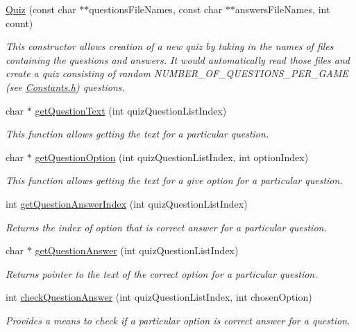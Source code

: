 \begin{DoxyCompactItemize}
\item 
\mbox{\hyperlink{class_quiz_a406e76ea2588e0dd0199ef92435241c2}{Quiz}} (const char $\ast$$\ast$questions\+File\+Names, const char $\ast$$\ast$answers\+File\+Names, int count)
\begin{DoxyCompactList}\small\item\em This constructor allows creation of a new quiz by taking in the names of files containing the questions and answers. It would automatically read those files and create a quiz consisting of random N\+U\+M\+B\+E\+R\+\_\+\+O\+F\+\_\+\+Q\+U\+E\+S\+T\+I\+O\+N\+S\+\_\+\+P\+E\+R\+\_\+\+G\+A\+ME (see \mbox{\hyperlink{_constants_8h_source}{Constants.\+h}}) questions. \end{DoxyCompactList}\item 
char $\ast$ \mbox{\hyperlink{class_quiz_a2e4f114860239291825a0b7fc8b97316}{get\+Question\+Text}} (int quiz\+Question\+List\+Index)
\begin{DoxyCompactList}\small\item\em This function allows getting the text for a particular question. \end{DoxyCompactList}\item 
char $\ast$ \mbox{\hyperlink{class_quiz_a87bca63da7123d0c2daca97e57d4032a}{get\+Question\+Option}} (int quiz\+Question\+List\+Index, int option\+Index)
\begin{DoxyCompactList}\small\item\em This function allows getting the text for a give option for a particular question. \end{DoxyCompactList}\item 
int \mbox{\hyperlink{class_quiz_a177966a2aa25acd1ca88a293f6b1ad43}{get\+Question\+Answer\+Index}} (int quiz\+Question\+List\+Index)
\begin{DoxyCompactList}\small\item\em Returns the index of option that is correct answer for a particular question. \end{DoxyCompactList}\item 
char $\ast$ \mbox{\hyperlink{class_quiz_a9889abe5ef272cb557d1b0ada490b070}{get\+Question\+Answer}} (int quiz\+Question\+List\+Index)
\begin{DoxyCompactList}\small\item\em Returns pointer to the text of the correct option for a particular question. \end{DoxyCompactList}\item 
int \mbox{\hyperlink{class_quiz_a8be2b23747e3467eafcadd9503f82798}{check\+Question\+Answer}} (int quiz\+Question\+List\+Index, int chosen\+Option)
\begin{DoxyCompactList}\small\item\em Provides a means to check if a particular option is correct answer for a question. \end{DoxyCompactList}\end{DoxyCompactItemize}


